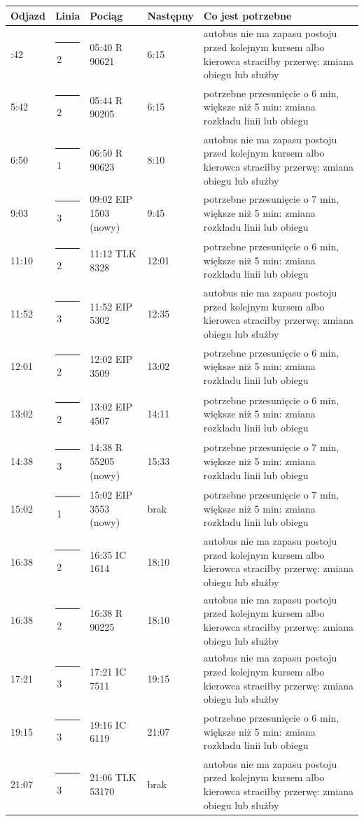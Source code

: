 \documentclass[10pt,a4paper]{article}
\newcommand{\linedot}[1]{\textcolor{#1}{\rule[0.1ex]{0.9ex}{0.9ex}}\,}
\begin{document}
{\footnotesize
\begin{longtable}{@{}l l l l p{6.4cm}@{}}\toprule
Odjazd & Linia & Pociąg & Następny & Co jest potrzebne \\ \midrule\endhead
\bottomrule\endfoot
5:42 & \linedot{L2}2 & 05:40 R 90621 & 6:15 & autobus nie ma zapasu postoju przed kolejnym kursem albo kierowca straciłby przerwę: zmiana obiegu lub służby \\
5:42 & \linedot{L2}2 & 05:44 R 90205 & 6:15 & potrzebne przesunięcie o 6 min, większe niż 5 min: zmiana rozkładu linii lub obiegu \\
6:50 & \linedot{L1}1 & 06:50 R 90623 & 8:10 & autobus nie ma zapasu postoju przed kolejnym kursem albo kierowca straciłby przerwę: zmiana obiegu lub służby \\
9:03 & \linedot{L3}3 & 09:02 EIP 1503 (nowy) & 9:45 & potrzebne przesunięcie o 7 min, większe niż 5 min: zmiana rozkładu linii lub obiegu \\
11:10 & \linedot{L2}2 & 11:12 TLK 8328 & 12:01 & potrzebne przesunięcie o 6 min, większe niż 5 min: zmiana rozkładu linii lub obiegu \\
11:52 & \linedot{L3}3 & 11:52 EIP 5302 & 12:35 & autobus nie ma zapasu postoju przed kolejnym kursem albo kierowca straciłby przerwę: zmiana obiegu lub służby \\
12:01 & \linedot{L2}2 & 12:02 EIP 3509 & 13:02 & potrzebne przesunięcie o 6 min, większe niż 5 min: zmiana rozkładu linii lub obiegu \\
13:02 & \linedot{L2}2 & 13:02 EIP 4507 & 14:11 & potrzebne przesunięcie o 6 min, większe niż 5 min: zmiana rozkładu linii lub obiegu \\
14:38 & \linedot{L3}3 & 14:38 R 55205 (nowy) & 15:33 & potrzebne przesunięcie o 7 min, większe niż 5 min: zmiana rozkładu linii lub obiegu \\
15:02 & \linedot{L1}1 & 15:02 EIP 3553 (nowy) & brak & potrzebne przesunięcie o 7 min, większe niż 5 min: zmiana rozkładu linii lub obiegu \\
16:38 & \linedot{L2}2 & 16:35 IC 1614 & 18:10 & autobus nie ma zapasu postoju przed kolejnym kursem albo kierowca straciłby przerwę: zmiana obiegu lub służby \\
16:38 & \linedot{L2}2 & 16:38 R 90225 & 18:10 & autobus nie ma zapasu postoju przed kolejnym kursem albo kierowca straciłby przerwę: zmiana obiegu lub służby \\
17:21 & \linedot{L3}3 & 17:21 IC 7511 & 19:15 & autobus nie ma zapasu postoju przed kolejnym kursem albo kierowca straciłby przerwę: zmiana obiegu lub służby \\
19:15 & \linedot{L3}3 & 19:16 IC 6119 & 21:07 & potrzebne przesunięcie o 6 min, większe niż 5 min: zmiana rozkładu linii lub obiegu \\
21:07 & \linedot{L3}3 & 21:06 TLK 53170 & brak & autobus nie ma zapasu postoju przed kolejnym kursem albo kierowca straciłby przerwę: zmiana obiegu lub służby \\
\end{longtable}}
\end{document}
